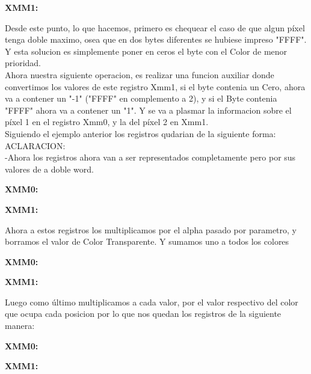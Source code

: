\par{\textbf{XMM1:}}

\qquad 	Desde este punto, lo que hacemos, primero es chequear el caso de que algun píxel tenga doble maximo, osea que en dos bytes diferentes se hubiese impreso "FFFF". Y esta solucion es simplemente poner en ceros el byte con el Color de menor prioridad. \\       Ahora  nuestra siguiente operacion, es realizar una funcion auxiliar donde convertimos los valores de este registro Xmm1, si el byte contenia un Cero, ahora va a contener un "-1" ("FFFF" en complemento a 2), y si el Byte contenia "FFFF" ahora va a contener un "1". Y se va a plasmar la informacion sobre el píxel 1 en el registro Xmm0, y la del píxel 2 en Xmm1.\\  Siguiendo el ejemplo anterior los registros qudarian de la siguiente forma:\\  	 ACLARACION: \\ -Ahora los registros ahora van a ser representados completamente pero por sus valores de a doble word. 

\par{\textbf{XMM0:}}

\par{\textbf{XMM1:}}

\par{}
\par{Ahora a estos registros los multiplicamos por el alpha pasado por parametro, y borramos el valor de Color Transparente. Y sumamos uno a todos los colores}
\par{}

\par{\textbf{XMM0:}}

\par{\textbf{XMM1:}}


\par{Luego como último multiplicamos a cada valor, por el valor respectivo del color que ocupa cada posicion por lo que nos quedan los registros de la siguiente manera:}

\par{\textbf{XMM0:}}

\par{\textbf{XMM1:}}
	

